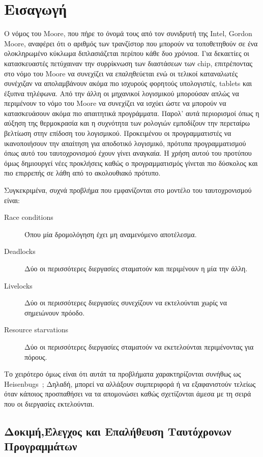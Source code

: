 \chapter{Εισαγωγή}

Ο νόμος του Moore, που πήρε το όνομά τους από τον συνιδρυτή της Intel, Gordon Moore, αναφέρει ότι ο αριθμός των τρανζίστορ που
μπορούν να τοποθετηθούν σε ένα ολοκληρωμένο κύκλωμα διπλασιάζεται περίπου κάθε δυο χρόνιοα. Για δεκαετίες οι κατασκευαστές 
πετύχαιναν την συρρίκνωση των διαστάσεων των chip, επιτρέποντας στο νόμο του Moore να συνεχίζει να επαληθεύεται ενώ οι 
τελικοί καταναλωτές συνέχιζαν να απολαμβάνουν ακόμα πιο ισχυρούς φορητούς υπολογιστές, tablets και έξυπνα τηλέφωνα. Από την
άλλη οι μηχανικοί λογισμικού μπορούσαν απλώς να περιμένουν το νόμο του Moore να συνεχίζει να ισχύει ώστε να μπορούν να κατασκευάσουν
ακόμα πιο απαιτητικά προγράμματα. Παρολ' αυτά περιορισμοί όπως η αύξηση της θερμοκρασία και η συχνότητα των ρολογιών εμποδίζουν
την περεταίρω βελτίωση στην επίδοση του λογισμικού. Προκειμένου οι προγραμματιστές να ικανοποιήσουν την απαίτηση για αποδοτικό
λογισμικό, πρότυπα προγραμματισμού όπως αυτό του ταυτοχρονισμού έχουν γίνει αναγκαία. Η χρήση αυτού του προτύπου όμως δημιουργεί νέες 
προκλήσεις καθώς ο προγραμματισμός γίνεται πιο δύσκολος και πιο επιρρεπής σε λάθη από το ακολουθιακό πρότυπο.
 
Συγκεκριμένα, συχνά προβλήμα που εμφανίζονται στο μοντέλο του ταυτοχρονισμού είναι:
\begin{description}
\item[Race conditions] Όπου μία δρομολόγηση έχει μη αναμενόμενο αποτέλεσμα. 
\item[Deadlocks] Δύο οι περισσότερες διεργασίες σταματούν και περιμένουν η μία την άλλη.
\item[Livelocks] Δύο οι περισσότερες διεργασίες συνεχίζουν να εκτελούνται χωρίς να σημειώνουν πρόοδο.
\item[Resource starvations] Δύο οι περισσότερες διεργασίες σταματούν να εκετελούνται περιμένοντας για πόρους.
\end{description}
Το χειρότερο όμως είναι ότι αυτάτ τα προβλήματα χαρακτηρίζονται συνήθως ως Heisenbugs~\cite{Musu08}; 
Δηλαδή, μπορεί να αλλάξουν συμπεριφορά ή να εξαφανιστούν τελείως όταν κάποιος προσπαθήσει να τα απομονώσει καθώς 
σχετίζονται άμεσα με τη σειρά που οι διεργασίες εκτελούνται.

\section{Δοκιμή,Έλεγχος και Επαλήθευση Ταυτόχρονων Προγραμμάτων}


